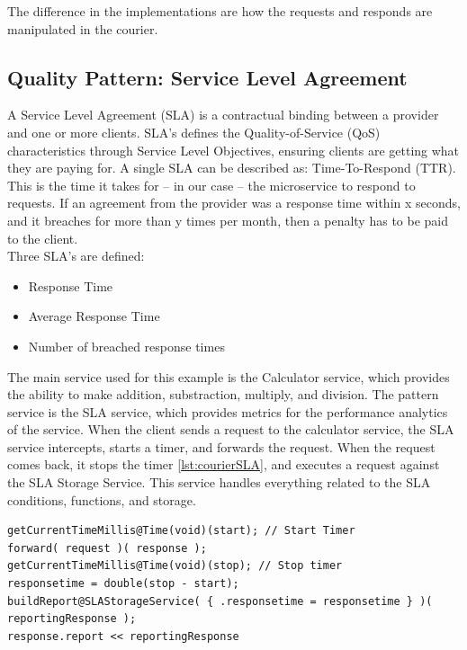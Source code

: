 \documentclass[12pt]{article}
\begin{document}
The difference in the implementations are how the requests and responds are manipulated in the courier.

\subsection{Quality Pattern: Service Level Agreement}
A Service Level Agreement (SLA) \cite{SLA:1} is a contractual binding between a provider and one or more clients. SLA's defines the Quality-of-Service (QoS) \cite{QoS:1} characteristics through Service Level Objectives, ensuring clients are getting what they are paying for. A single SLA can be described as: Time-To-Respond (TTR). This is the time it takes for -- in our case -- the microservice to respond to requests. If an agreement from the provider was a response time within x seconds, and it breaches for more than y times per month, then a penalty has to be paid to the client. \\

Three SLA's are defined:
\begin{itemize}
    \item Response Time
    \item Average Response Time
    \item Number of breached response times
\end{itemize}

The main service used for this example is the Calculator service, which provides the ability to make addition, substraction, multiply, and division. The pattern service is the SLA service, which provides metrics for the performance analytics of the service. When the client sends a request to the calculator service, the SLA service intercepts, starts a timer, and forwards the request. When the request comes back, it stops the timer \ref{lst:courierSLA}, and executes a request against the SLA Storage Service. This service handles everything related to the SLA conditions, functions, and storage. 

\begin{lstlisting}[caption=Courier operations for the SLA service, 
captionpos=b, label=courierSLA, frame=single, breaklines=true]
getCurrentTimeMillis@Time(void)(start); // Start Timer
forward( request )( response );
getCurrentTimeMillis@Time(void)(stop); // Stop timer
responsetime = double(stop - start);
buildReport@SLAStorageService( { .responsetime = responsetime } )( reportingResponse );
response.report << reportingResponse
\end{lstlisting}
\end{document}

